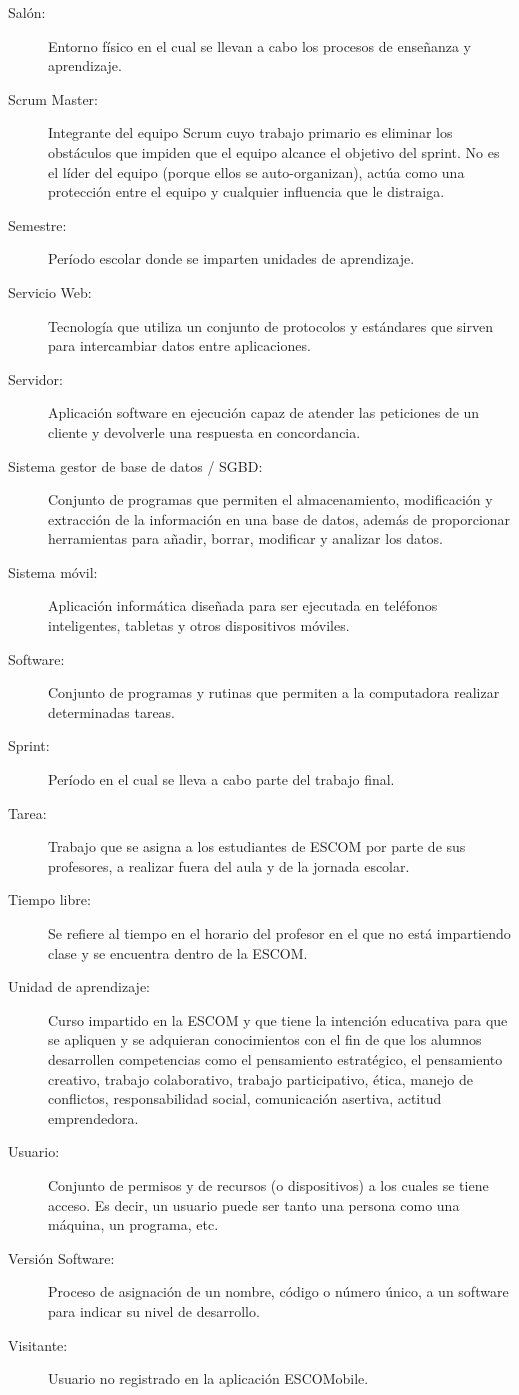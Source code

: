 \begin{description}
	\item[Salón:] Entorno físico en el cual se llevan a cabo los procesos de enseñanza y aprendizaje.
	\item[Scrum Master:] Integrante del equipo Scrum cuyo trabajo primario es eliminar los obstáculos que impiden que el equipo alcance el objetivo del sprint. No es el líder del equipo (porque ellos se auto-organizan), actúa como una protección entre el equipo y cualquier influencia que le distraiga. 
	\item[Semestre:] Período escolar donde se imparten unidades de aprendizaje.
	\item[Servicio Web:] Tecnología que utiliza un conjunto de protocolos y estándares que sirven para intercambiar datos entre aplicaciones.
	\item[Servidor:] Aplicación software en ejecución capaz de atender las peticiones de un cliente y devolverle una respuesta en concordancia.
	\item[Sistema gestor de base de datos / SGBD:] Conjunto de programas que permiten el almacenamiento, modificación y extracción de la información en una base de datos, además de proporcionar herramientas para añadir, borrar, modificar y analizar los datos. 
	\item[Sistema móvil:] Aplicación informática diseñada para ser ejecutada en teléfonos inteligentes, tabletas y otros dispositivos móviles. 
	\item[Software:] Conjunto de programas y rutinas que permiten a la computadora realizar determinadas tareas.
	\item[Sprint:] Período en el cual se lleva a cabo parte del trabajo final. 

	\item[Tarea:] Trabajo que se asigna a los estudiantes de ESCOM por parte de sus profesores, a realizar fuera del aula y de la jornada escolar.
	\item[Tiempo libre:] Se refiere al tiempo en el horario del profesor en el que no está impartiendo clase y se encuentra dentro de la ESCOM.
	
	\item[Unidad de aprendizaje:] Curso impartido en la ESCOM y que tiene la intención educativa para que se apliquen y se adquieran conocimientos con el fin de que los alumnos desarrollen competencias como el pensamiento estratégico, el pensamiento creativo, trabajo colaborativo, trabajo participativo, ética, manejo de conflictos, responsabilidad social, comunicación asertiva, actitud emprendedora.
	\item[Usuario:] Conjunto de permisos y de recursos (o dispositivos) a los cuales se tiene acceso. Es decir, un usuario puede ser tanto una persona como una máquina, un programa, etc.
	
	\item[Versión Software:] Proceso de asignación de un nombre, código o número único, a un software para indicar su nivel de desarrollo.
	\item[Visitante:] Usuario no registrado en la aplicación ESCOMobile.
\end{description}

